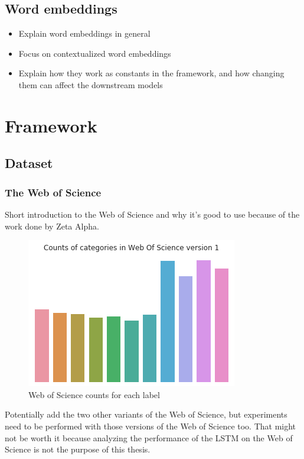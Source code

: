 \documentclass[12pt]{report}
\begin{document}
\section{Word embeddings}

\begin{itemize}
    \item Explain word embeddings in general
    \item Focus on contextualized word embeddings
    \item Explain how they work as constants in the framework, and how changing them can affect the downstream models
\end{itemize}

\chapter{Framework}

\section{Dataset}

\subsection{The Web of Science}

Short introduction to the Web of Science and why it's good to use because of the work done by Zeta Alpha.

\begin{figure}[ht!]
\centering
\includegraphics[width=0.8\linewidth]{assets/framework/wos_counts_1.png}
\caption{Web of Science counts for each label}
\label{fig:wos-1}
\end{figure}

Potentially add the two other variants of the Web of Science, but experiments need to be performed with those versions of the Web of Science too. That might not be worth it because analyzing the performance of the LSTM on the Web of Science is not the purpose of this thesis.
\end{document}
